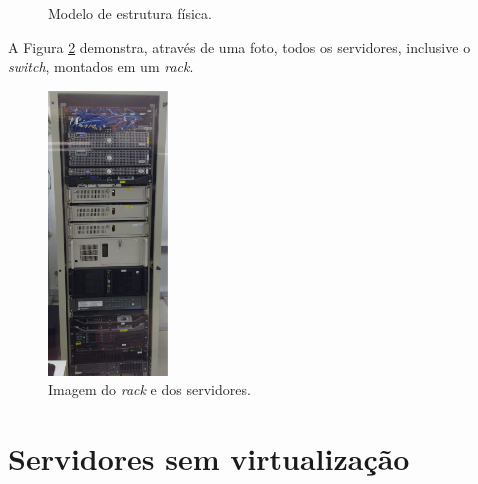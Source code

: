 \begin{figure}[h!]
 \centering
 \caption{Modelo de estrutura física.}
 \label{fig:servfisicos}
\end{figure}

A Figura \ref{fig:servrack} demonstra, através de uma foto, todos os servidores, inclusive o \textit{switch}, montados em um \textit{rack}.

\begin{figure}[h!]
 \centering
 \includegraphics[width=120px]{img/servrack.eps}
 \caption{Imagem do \textit{rack} e dos servidores.}
 \label{fig:servrack}
\end{figure}

\section{Servidores sem virtualização}
\label{section:servsemvirt}

